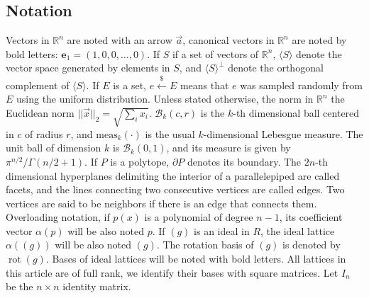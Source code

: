 \documentclass[11pt]{article}
\theoremstyle{plain}
\theoremstyle{definition}
\theoremstyle{remark}
\newcommand{\RR}{\mathbb{R}}      %
\newcommand{\ee}{\mathbf{e}}
\newcommand{\meas}{\mbox{meas}}
\newcommand{\rot}{\operatorname{rot}}
\newcommand{\bra}{\langle}
\newcommand{\ket}{\rangle}
\begin{document}
\subsection{Notation}
Vectors in $\RR^n$ are noted with an arrow $\vec{a}$, canonical vectors in $\RR^n$ are noted by bold letters: $\ee_1=(1,0,0,\dots,0)$. If $S$ if a set of vectors of $\RR^n$, $\bra S\ket$ denote the vector space generated by elements in $S$, and $\bra S\ket^\perp$ denote the orthogonal complement of $\bra S\ket$. If $E$ is a set, $e\xleftarrow{\$}E$ means that $e$ was sampled randomly from $E$ using the uniform distribution. Unless stated otherwise, the norm in $\RR^n$ the Euclidean norm $||\vec x||_2=\sqrt{\sum_i x_i}$. $\mathcal{B}_k(c,r)$ is the $k$-th dimensional ball centered in $c$ of radius $r$, and $\meas_k(\cdot)$ is the usual $k$-dimensional Lebesgue measure. The unit ball of dimension $k$ is $\mathcal{B}_k(0,1)$, and its measure is given by $\pi^{n/2}/\Gamma(n/2+1)$. If $P$ is a polytope, $\partial P$ denotes its boundary. The $2n$-th dimensional hyperplanes delimiting the interior of a parallelepiped are called facets, and the lines connecting two consecutive vertices are called edges. Two vertices are said to be neighbors if there is an edge that connects them. Overloading notation, if $p(x)$ is a polynomial of degree $n-1$, its coefficient vector $\alpha(p)$ will be also noted $p$. If $(g)$ is an ideal in $R$, the ideal lattice $\alpha((g))$ will be also noted $(g)$. The rotation basis of $(g)$ is denoted by $\rot(g)$. Bases of ideal lattices will be noted with bold letters. All lattices in this article are of full rank, we identify their bases with square matrices. Let $I_n$ be the $n\times n$ identity matrix.
\end{document}
